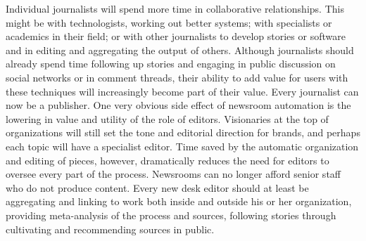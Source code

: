 Individual journalists will spend more time in collaborative relationships. This
might be with technologists, working out better systems; with specialists or academics
in their field; or with other journalists to develop stories or software and
in editing and aggregating the output of others.
Although journalists should already spend time following up stories and engaging
in public discussion on social networks or in comment threads, their ability
to add value for users with these techniques will increasingly become part of
their value.
Every journalist can now be a publisher. One very obvious side effect of newsroom
automation is the lowering in value and utility of the role of editors.
Visionaries at the top of organizations will still set the tone and editorial direction
for brands, and perhaps each topic will have a specialist editor. Time saved by
the automatic organization and editing of pieces, however, dramatically reduces
the need for editors to oversee every part of the process. Newsrooms can no
longer afford senior staff who do not produce content. Every new desk editor
should at least be aggregating and linking to work both inside and outside his or
her organization, providing meta-analysis of the process and sources, following
stories through cultivating and recommending sources in public.

